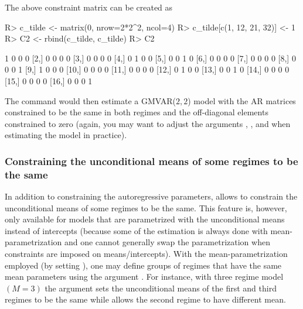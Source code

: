 \documentclass[nojss]{jss}
\begin{document}
The above constraint matrix can be created as
%
\begin{CodeChunk}
\begin{CodeInput}
R> c_tilde <- matrix(0, nrow=2*2^2, ncol=4)
R> c_tilde[c(1, 12, 21, 32)] <- 1
R> C2 <- rbind(c_tilde, c_tilde)
R> C2
\end{CodeInput}
\begin{CodeOutput}
      [,1] [,2] [,3] [,4]
 [1,]    1    0    0    0
 [2,]    0    0    0    0
 [3,]    0    0    0    0
 [4,]    0    1    0    0
 [5,]    0    0    1    0
 [6,]    0    0    0    0
 [7,]    0    0    0    0
 [8,]    0    0    0    1
 [9,]    1    0    0    0
[10,]    0    0    0    0
[11,]    0    0    0    0
[12,]    0    1    0    0
[13,]    0    0    1    0
[14,]    0    0    0    0
[15,]    0    0    0    0
[16,]    0    0    0    1
\end{CodeOutput}
\end{CodeChunk}
%
The command  would then estimate a GMVAR($2,2$) model with the AR matrices constrained to be the same in both regimes and the off-diagonal elements constrained to zero (again, you may want to adjust the arguments , , and  when estimating the model in practice).


\subsubsection{Constraining the unconditional means of some regimes to be the same}

In addition to constraining the autoregressive parameters,  allows to constrain the unconditional means of some regimes to be the same. This feature is, however, only available for models that are parametrized with the unconditional means instead of intercepts (because some of the estimation is always done with mean-parametrization and one cannot generally swap the parametrization when constraints are imposed on means/intercepts). With the mean-parametrization employed (by setting ), one may define groups of regimes that have the same mean parameters using the argument . For instance, with three regime model $(M=3)$ the argument  sets the unconditional means of the first and third regimes to be the same while allows the second regime to have different mean.
\end{document}
